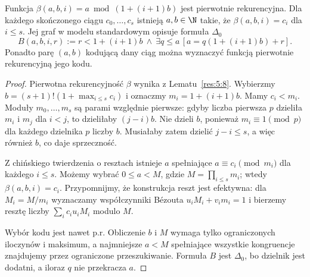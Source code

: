 \begin{lemat}\label{res:7:4}
Funkcja $\beta(a,b,i)=a\bmod(1+(i+1)b)$ jest pierwotnie rekurencyjna. Dla każdego skończonego ciągu $c_0,\ldots,c_s$ istnieją $a,b\in\N$ takie, że $\beta(a,b,i)=c_i$ dla $i\le s$. Jej graf w modelu standardowym opisuje formuła $\Delta_0$
\[
B(a,b,i,r):=r<1+(i+1)b\ \land\
\exists q\le a\,[a=q(1+(i+1)b)+r].
\]
Ponadto parę $(a,b)$ kodującą dany ciąg można wyznaczyć funkcją pierwotnie rekurencyjną jego kodu.
\end{lemat}
\begin{proof}
Pierwotna rekurencyjność $\beta$ wynika z Lematu~\ref{res:5:8}. Wybierzmy $b=(s+1)!(1+\max_{i\le s}c_i)$ i oznaczmy $m_i=1+(i+1)b$. Mamy $c_i<m_i$. Moduły $m_0,\ldots,m_s$ są parami względnie pierwsze: gdyby liczba pierwsza $p$ dzieliła $m_i$ i $m_j$ dla $i<j$, to dzieliłaby $(j-i)b$. Nie dzieli $b$, ponieważ $m_i\equiv1\pmod p$ dla każdego dzielnika $p$ liczby $b$. Musiałaby zatem dzielić $j-i\le s$, a więc również $b$, co daje sprzeczność.

Z chińskiego twierdzenia o resztach istnieje $a$ spełniające $a\equiv c_i\pmod{m_i}$ dla każdego $i\le s$. Możemy wybrać $0\le a<M$, gdzie $M=\prod_{i\le s}m_i$; wtedy $\beta(a,b,i)=c_i$. Przypomnijmy, że konstrukcja reszt jest efektywna: dla $M_i=M/m_i$ wyznaczamy współczynniki Bézouta $u_iM_i+v_im_i=1$ i bierzemy resztę liczby $\sum_i c_i u_iM_i$ modulo $M$.

Wybór kodu jest nawet p.r. Obliczenie $b$ i $M$ wymaga tylko ograniczonych iloczynów i maksimum, a najmniejsze $a<M$ spełniające wszystkie kongruencje znajdujemy przez ograniczone przeszukiwanie. Formuła $B$ jest $\Delta_0$, bo dzielnik jest dodatni, a iloraz $q$ nie przekracza $a$.
\end{proof}

